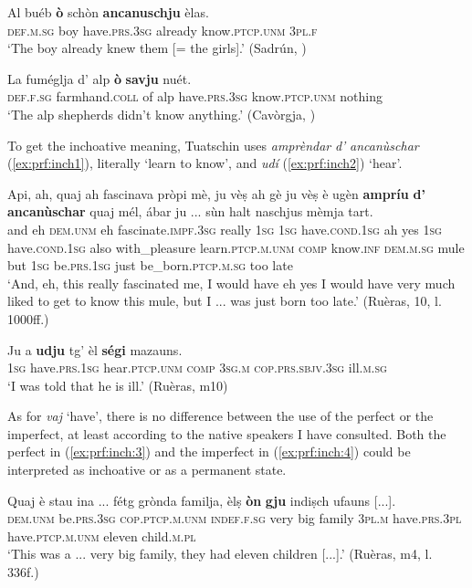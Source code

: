 \ea\label{ex:prf:schon}
\gll   Al buéb \textbf{ò} schòn \textbf{ancanuschju} èlas. \\
     \textsc{def.m.sg} boy have.\textsc{prs.3sg} already know.\textsc{ptcp.unm} \textsc{3pl.f}\\
\glt `The boy already knew them [= the girls].' (Sadrún, \citealt[103]{Büchli1966})
\z

\ea\label{ex:prf:inch:2}
\gll    La fuméglja d’ alp \textbf{ò} \textbf{savju} nuét.\\
     \textsc{def.f.sg} farmhand.\textsc{coll} of alp have.\textsc{prs.3sg} know.\textsc{ptcp.unm} nothing\\
\glt `The alp shepherds didn’t know anything.' (Cavòrgja, \citealt[53]{Büchli1966})
\z

To get the inchoative meaning, Tuatschin uses \textit{amprèndar} \textit{d'} \textit{ancanùschar} (\ref{ex:prf:inch1}), literally `learn to know', and \textit{udí} (\ref{ex:prf:inch2}) `hear'.

\ea
\label{ex:prf:inch1}
\gll  Api, ah, quaj ah fascinava pròpi mè, ju vèṣ ah gè ju vèṣ è ugèn \textbf{ampríu} \textbf{d’} \textbf{ancanùschar} quaj mél, ábar ju ... sùn halt naschjus mèmja tart. \\
and eh \textsc{dem.unm} eh fascinate.\textsc{impf.3sg} really \textsc{1sg}  \textsc{1sg} have.\textsc{cond.1sg} ah yes \textsc{1sg} have.\textsc{cond.1sg} also with\_pleasure learn.\textsc{ptcp.m.unm} \textsc{comp} know.\textsc{inf} \textsc{dem.m.sg} mule but \textsc{1sg} {} be.\textsc{prs.1sg} just be\_born.\textsc{ptcp.m.sg} too late\\
\glt `And, eh, this really fascinated me, I would have eh yes I would have very much liked to get to know this mule, but I ... was just born too late.' (Ruèras, 10, l. 1000ff.)
\z

\ea
\label{ex:prf:inch2}
\gll Ju a \textbf{udju} tg' èl \textbf{ségi} mazauns.\\
\textsc{1sg} have.\textsc{prs.1sg} hear.\textsc{ptcp.unm} \textsc{comp} \textsc{3sg.m} \textsc{cop.prs.sbjv.3sg} ill.\textsc{m.sg}\\
\glt `I was told that he is ill.' (Ruèras, m10)
\z

As for \textit{vaj} `have', there is no difference between the use of the perfect or the imperfect, at least according to the native speakers I have consulted. Both the perfect in (\ref{ex:prf:inch:3}) and the imperfect in (\ref{ex:prf:inch:4}) could be interpreted as inchoative or as a permanent state.

\ea
\label{ex:prf:inch:3}
\gll Quaj è stau ina ... fétg grònda familja, èlṣ \textbf{òn} \textbf{gju} indiṣch ufauns [...].\\
\textsc{dem.unm}  be.\textsc{prs.3sg}  \textsc{cop.ptcp.m.unm}  \textsc{indef.f.sg} {} very big family \textsc{3pl.m} have.\textsc{prs.3pl} have.\textsc{ptcp.m.unm} eleven child.\textsc{m.pl}\\
\glt `This was a ... very big family, they had eleven children [...].' (Ruèras, m4, l. 336f.)
\z

